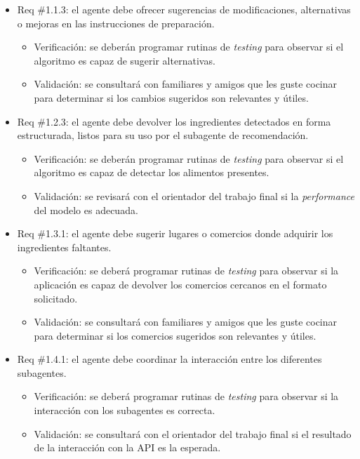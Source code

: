 \documentclass[
11pt, %
]{charter}
\begin{document}
\begin{itemize} 

\item Req \#1.1.3: el agente debe ofrecer sugerencias de modificaciones, alternativas o mejoras en las instrucciones de preparación.

\begin{itemize}
	\item Verificación: se deberán programar rutinas de \textit{testing} para observar si el algoritmo es capaz de sugerir alternativas.
	\item Validación: se consultará con familiares y amigos que les guste cocinar para determinar si los cambios sugeridos son relevantes y útiles.
\end{itemize}

\item Req \#1.2.3: el agente debe devolver los ingredientes detectados en forma estructurada, listos para su uso por el subagente de recomendación.

\begin{itemize}
	\item Verificación: se deberán programar rutinas de \textit{testing} para observar si el algoritmo es capaz de detectar los alimentos presentes.
	\item Validación: se revisará con el orientador del trabajo final si la \textit{performance} del modelo es adecuada.
\end{itemize}

\item Req \#1.3.1: el agente debe sugerir lugares o comercios donde adquirir los ingredientes faltantes.

\begin{itemize}
	\item Verificación: se deberá programar rutinas de \textit{testing} para observar si la aplicación es capaz de devolver los comercios cercanos en el formato solicitado.
	\item Validación: se consultará con familiares y amigos que les guste cocinar para determinar si los comercios sugeridos son relevantes y útiles.
\end{itemize}

\item Req \#1.4.1: el agente debe coordinar la interacción entre los diferentes subagentes.

\begin{itemize}
	\item Verificación: se deberá programar rutinas de \textit{testing} para observar si la interacción con los subagentes es correcta.
	\item Validación: se consultará con el orientador del trabajo final si el resultado de la interacción con la API es la esperada.
\end{itemize}


\end{itemize}
\end{document}
